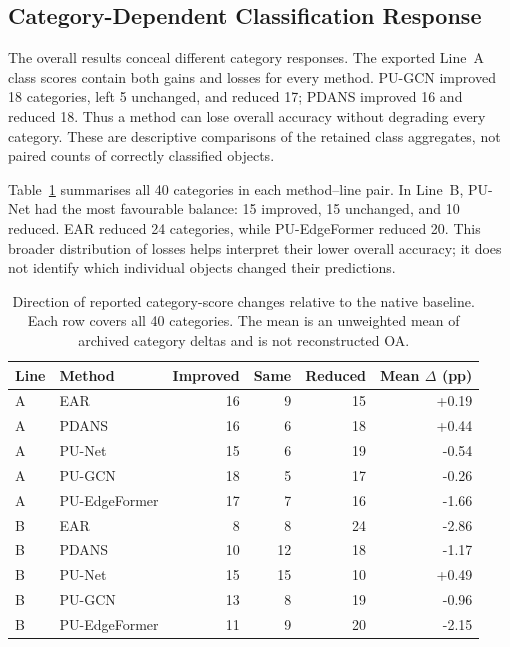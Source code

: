 \subsection{Category-Dependent Classification Response}
\label{sec:mn-categories}

The overall results conceal different category responses. The exported
Line~A class scores contain both gains and losses for every method.
PU-GCN improved 18 categories, left 5 unchanged, and reduced 17; PDANS
improved 16 and reduced 18. Thus a method can lose overall accuracy
without degrading every category. These are descriptive comparisons of
the retained class aggregates, not paired counts of correctly classified
objects.

Table~\ref{tab:mn-category-counts} summarises all 40 categories in each
method--line pair. In Line~B, PU-Net had the most favourable balance:
15 improved, 15 unchanged, and 10 reduced. EAR reduced 24 categories,
while PU-EdgeFormer reduced 20. This broader distribution of losses
helps interpret their lower overall accuracy; it does not identify
which individual objects changed their predictions.

\begin{table}[!t]\centering
\begin{tabular}{llrrrr}\toprule
Line & Method & Improved & Same & Reduced & Mean $\Delta$ (pp)\\\midrule
A & EAR & 16 & 9 & 15 & +0.19 \\
A & PDANS & 16 & 6 & 18 & +0.44 \\
A & PU-Net & 15 & 6 & 19 & -0.54 \\
A & PU-GCN & 18 & 5 & 17 & -0.26 \\
A & PU-EdgeFormer & 17 & 7 & 16 & -1.66 \\
B & EAR & 8 & 8 & 24 & -2.86 \\
B & PDANS & 10 & 12 & 18 & -1.17 \\
B & PU-Net & 15 & 15 & 10 & +0.49 \\
B & PU-GCN & 13 & 8 & 19 & -0.96 \\
B & PU-EdgeFormer & 11 & 9 & 20 & -2.15 \\
\bottomrule\end{tabular}
\caption{Direction of reported category-score changes relative to the
native baseline. Each row covers all 40 categories. The mean is an
unweighted mean of archived category deltas and is not reconstructed OA.}
\label{tab:mn-category-counts}\end{table}

